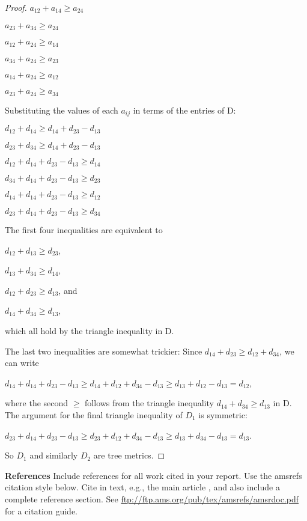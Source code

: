 \documentclass[12pt]{amsart}
\begin{document}
\begin{proof}
$a_{12} + a_{14} \geq a_{24}$

$a_{23} + a_{34} \geq a_{24}$

$a_{12} + a_{24} \geq a_{14}$

$a_{34} + a_{24} \geq a_{23}$

$a_{14} + a_{24} \geq a_{12}$

$a_{23} + a_{24} \geq a_{34}$

Substituting the values of each $a_{ij}$ in terms of the entries of D:

$d_{12} + d_{14} \geq d_{14}+d_{23}-d_{13}$

$d_{23} + d_{34} \geq d_{14}+d_{23}-d_{13}$

$d_{12} + d_{14}+d_{23}-d_{13} \geq d_{14}$

$d_{34} + d_{14}+d_{23}-d_{13} \geq d_{23}$

$d_{14} + d_{14}+d_{23}-d_{13} \geq d_{12}$

$d_{23} + d_{14}+d_{23}-d_{13} \geq d_{34}$

The first four inequalities are equivalent to

$d_{12}+d_{13} \geq d_{23}$,

$d_{13}+d_{34} \geq d_{14}$,

$d_{12}+d_{23} \geq d_{13}$, and

$d_{14}+d_{34} \geq d_{13}$,

which all hold by the triangle inequality in D.

The last two inequalities are somewhat trickier: Since $d_{14}+d_{23} \geq d_{12}+d_{34}$, we can write

$d_{14} + d_{14}+d_{23}-d_{13} \geq d_{14} + d_{12} + d_{34} - d_{13} \geq d_{13} + d_{12} - d_{13} = d_{12}$,

where the second $\geq$ follows from the triangle inequality $d_{14} + d_{34} \geq d_{13}$ in D. The argument for the final triangle inequality of $D_{1}$ is symmetric:

$d_{23} + d_{14}+d_{23}-d_{13} \geq d_{23}+d_{12} + d_{34} - d_{13} \geq d_{13} + d_{34} - d_{13} = d_{13}$.

So $D_{1}$ and similarly $D_{2}$ are tree metrics.
\end{proof}

{\large \bf References} 
 Include  references for all work cited in your report. Use the amsrefs citation style below. Cite in text, e.g., the main article \cite{speyer2009tropical}, and also include a complete reference section. See \url{ftp://ftp.ams.org/pub/tex/amsrefs/amsrdoc.pdf} for a citation guide.
\end{document}
